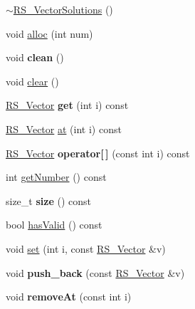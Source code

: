 \begin{DoxyCompactItemize}
\item 
\hyperlink{classRS__VectorSolutions_a1ea3e801ea26995f88f40d963561eef5}{$\sim$\-R\-S\-\_\-\-Vector\-Solutions} ()
\item 
void \hyperlink{classRS__VectorSolutions_ada403e67b8b57927fdaf83a2cac46199}{alloc} (int num)
\item 
\hypertarget{classRS__VectorSolutions_abc5911dc619e31c1de30aaa34379402b}{void {\bfseries clean} ()}\label{classRS__VectorSolutions_abc5911dc619e31c1de30aaa34379402b}

\item 
void \hyperlink{classRS__VectorSolutions_a082d95ead864d758ccc114747648443a}{clear} ()
\item 
\hypertarget{classRS__VectorSolutions_abbc7c2f7555426ebcada25eb84175d64}{\hyperlink{classRS__Vector}{R\-S\-\_\-\-Vector} {\bfseries get} (int i) const }\label{classRS__VectorSolutions_abbc7c2f7555426ebcada25eb84175d64}

\item 
\hyperlink{classRS__Vector}{R\-S\-\_\-\-Vector} \hyperlink{classRS__VectorSolutions_a53b7e15325fa7ec6f1c495961ddf9820}{at} (int i) const 
\item 
\hypertarget{classRS__VectorSolutions_a6871a4a153a94619cb516c7bae095635}{\hyperlink{classRS__Vector}{R\-S\-\_\-\-Vector} {\bfseries operator\mbox{[}$\,$\mbox{]}} (const int i) const }\label{classRS__VectorSolutions_a6871a4a153a94619cb516c7bae095635}

\item 
int \hyperlink{classRS__VectorSolutions_ac58714e2b0e2f2f91a21c3832f9cdfb7}{get\-Number} () const 
\item 
\hypertarget{classRS__VectorSolutions_aed06f9b3f6a5856f860210663ba1affc}{size\-\_\-t {\bfseries size} () const }\label{classRS__VectorSolutions_aed06f9b3f6a5856f860210663ba1affc}

\item 
bool \hyperlink{classRS__VectorSolutions_a4effe2cdc76aa4add84ba412363b8727}{has\-Valid} () const 
\item 
void \hyperlink{classRS__VectorSolutions_acb15556964c07cf20c59c4b26bad2623}{set} (int i, const \hyperlink{classRS__Vector}{R\-S\-\_\-\-Vector} \&v)
\item 
\hypertarget{classRS__VectorSolutions_a88a34f5e0e7fd7462a4bb564649f2cce}{void {\bfseries push\-\_\-back} (const \hyperlink{classRS__Vector}{R\-S\-\_\-\-Vector} \&v)}\label{classRS__VectorSolutions_a88a34f5e0e7fd7462a4bb564649f2cce}

\item 
\hypertarget{classRS__VectorSolutions_a082c5b629ec8099892e3de11ba42a1fa}{void {\bfseries remove\-At} (const int i)}\label{classRS__VectorSolutions_a082c5b629ec8099892e3de11ba42a1fa}


\end{DoxyCompactItemize}
